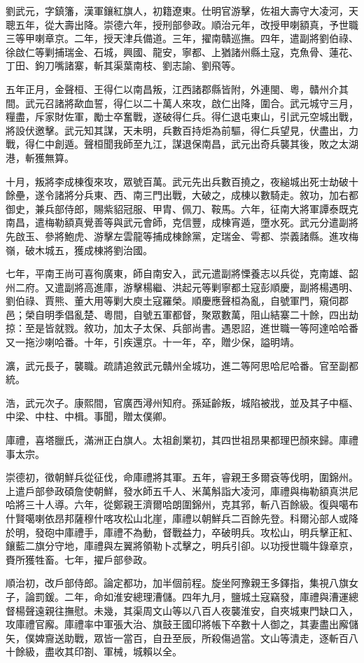 \begin{pinyinscope}
劉武元，字鎮籓，漢軍鑲紅旗人，初籍遼東。仕明官游擊，佐祖大壽守大凌河，天聰五年，從大壽出降。崇德六年，授刑部參政。順治元年，改授甲喇額真，予世職三等甲喇章京。二年，授天津兵備道。三年，擢南贛巡撫。四年，遣副將劉伯祿、徐啟仁等剿捕瑞金、石城，興國、龍安，寧都、上猶諸州縣土寇，克魚骨、蓮花、丁田、鉤刀嘴諸寨，斬其渠葉南枝、劉志諭、劉飛等。

五年正月，金聲桓、王得仁以南昌叛，江西諸郡縣皆附，外連閩、粵，贛州介其間。武元召諸將歃血誓，得仁以二十萬人來攻，啟仁出降，圍合。武元城守三月，糧盡，斥家財佐軍，勵士卒奮戰，遂破得仁兵。得仁退屯東山，引武元空城出戰，將設伏邀擊。武元知其謀，天未明，兵數百持炬為前驅，得仁兵望見，伏盡出，力戰，得仁中創遁。聲桓聞我師至九江，謀退保南昌，武元出奇兵襲其後，敗之太湖港，斬獲無算。

十月，叛將李成棟復來攻，眾號百萬。武元先出兵數百撓之，夜縋城出死士劫破十餘壘，遂令諸將分兵東、西、南三門出戰，大破之，成棟以數騎走。敘功，加右都御史，兼兵部侍郎，賜紫貂冠服、甲胄、佩刀、鞍馬。六年，征南大將軍譚泰既克南昌，遣梅勒額真覺善等與武元會師，克信豐，成棟宵遁，墮水死。武元分遣副將先啟玉、參將鮑虎、游擊左雲龍等捕成棟餘黨，定瑞金、雩都、崇義諸縣。進攻梅嶺，破木城五，獲成棟將劉治國。

七年，平南王尚可喜徇廣東，師自南安入，武元遣副將慄養志以兵從，克南雄、韶州二府。又遣副將高進庫，游擊楊繼、洪起元等剿寧都土寇彭順慶，副將楊遇明、劉伯祿、賈熊、董大用等剿大庾土寇羅榮。順慶應聲桓為亂，自號軍門，窺伺郡邑；榮自明季倡亂楚、粵間，自號五軍都督，聚眾數萬，阻山結寨二十餘，四出劫掠：至是皆就戮。敘功，加太子太保、兵部尚書。遇恩詔，進世職一等阿達哈哈番又一拖沙喇哈番。十年，引疾還京。十一年，卒，贈少保，謚明靖。

瀇，武元長子，襲職。疏請追敘武元贛州全城功，進二等阿思哈尼哈番。官至副都統。

浩，武元次子。康熙間，官廣西潯州知府。孫延齡叛，城陷被戕，並及其子中樞、中梁、中柱、中楫。事聞，贈太僕卿。

庫禮，喜塔臘氏，滿洲正白旗人。太祖創業初，其四世祖昂果都理巴顏來歸。庫禮事太宗。

崇德初，徵朝鮮兵從征伐，命庫禮將其軍。五年，睿親王多爾袞等伐明，圍錦州。上遣戶部參政碩詹使朝鮮，發水師五千人、米萬斛詣大凌河，庫禮與梅勒額真洪尼哈將三十人導。六年，從鄭親王濟爾哈朗圍錦州，克其郛，斬八百餘級。復與噶布什賢噶喇依昂邦薩穆什喀攻松山北崖，庫禮以朝鮮兵二百餘先登。科爾沁部人或降於明，發砲中庫禮手，庫禮不為動，督戰益力，卒破明兵。攻松山，明兵擊正紅、鑲藍二旗分守地，庫禮與左翼將領勒卜忒擊之，明兵引卻。以功授世職牛錄章京，賚所獲牲畜。七年，擢戶部參政。

順治初，改戶部侍郎。論定都功，加半個前程。旋坐阿豫親王多鐸指，集視八旗女子，論罰鍰。二年，命如淮安總理漕儲。四年九月，鹽城土寇竊發，庫禮與漕運總督楊聲遠親往撫慰。未幾，其渠周文山等以八百人夜襲淮安，自夾城東門缺口入，攻庫禮官廨。庫禮率中軍張大治、旗鼓王國印將帳下卒數十人御之，其妻盡出廨儲矢，僕婢齎送助戰，眾皆一當百，自丑至辰，所殺傷過當。文山等潰走，逐斬百八十餘級，盡收其印劄、軍械，城賴以全。


\end{pinyinscope}
